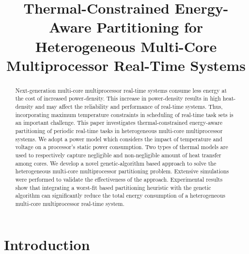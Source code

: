\documentclass[conference]{IEEEtran}
\begin{document}
\title{\LARGE Thermal-Constrained Energy-Aware Partitioning for Heterogeneous Multi-Core Multiprocessor Real-Time Systems}

\author{
 }


\maketitle


\begin{abstract}
Next-generation multi-core multiprocessor real-time systems consume less energy at the cost of increased power-density. 
This increase in power-density results in high
heat-density and may affect the reliability and performance of real-time systems. Thus, incorporating maximum temperature
constraints in scheduling of real-time task sets is an important challenge.
This paper investigates thermal-constrained energy-aware %
partitioning of periodic real-time tasks in heterogeneous multi-core
multiprocessor systems. We adopt a power model which considers the impact of temperature and voltage on a processor's static power consumption. 
Two types of thermal models are used to respectively capture negligible and non-negligible amount of heat 
transfer among cores. %
We develop a novel genetic-algorithm based approach to solve the heterogeneous multi-core multiprocessor partitioning problem. 
Extensive simulations were performed to validate the effectiveness of the approach. 
Experimental results show that integrating a worst-fit based partitioning heuristic with the genetic algorithm %
can significantly 
reduce the  total energy consumption of a heterogeneous multi-core multiprocessor real-time system.
\end{abstract}

\vspace{-0.1in}

\section{Introduction}
\end{document}
